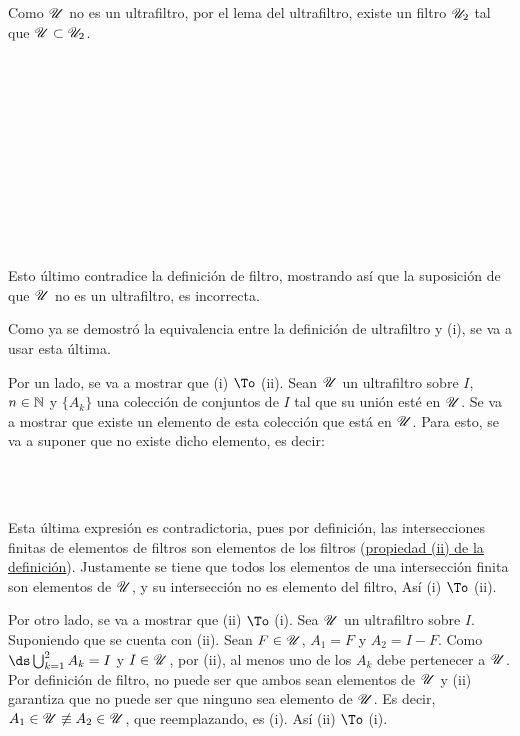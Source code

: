 \begin{demo}[i]
  Como $\mathscr{U}$ no es un ultrafiltro, por el lema del ultrafiltro, existe
  un filtro $\mathscr{U}_2$ tal que $\mathscr{U} \subset \mathscr{U}_2$.
  \begin{longderivation}
      \\
    \equiv\\
      \\
    \\
      \\
    \\
      \\
    \equiv\\
      \\
    \\
  \end{longderivation}
  Esto último contradice la definición de filtro, mostrando así que la
  suposición de que $\mathscr{U}$ no es un ultrafiltro, es incorrecta.
\end{demo}
\begin{demo}[ii]
  Como ya se demostró la equivalencia entre la definición de
  ultrafiltro y (i), se va a usar esta última.

  Por un lado, se va a mostrar que (i) $\To$ (ii).
  Sean $\mathscr{U}$ un ultrafiltro sobre $I$, $n\in\mathbb{N}$ y $\{A_k\}$ una colección
  de conjuntos de $I$ tal que su unión esté en $\mathscr{U}$. Se va a mostrar
  que existe un elemento de esta colección que está en $\mathscr{U}$. Para
  esto, se va a suponer que no existe dicho elemento, es decir:
  \begin{longderivation}
      \\
    \\
  \end{longderivation}
  Esta última expresión es contradictoria, pues por definición, las
  intersecciones finitas de elementos de filtros son elementos de los
  filtros (\hyperref[def:filtro]{propiedad (ii) de la definición}).
  Justamente se tiene que todos los elementos de una intersección finita
  son elementos de $\mathscr{U}$, y su intersección no es elemento del filtro, Así
  (i) $\To$ (ii).

  Por otro lado, se va a mostrar que (ii) $\To$ (i). Sea $\mathscr{U}$ un
  ultrafiltro sobre $I$. Suponiendo que se cuenta con (ii). Sean
  $F \in \mathscr{U}$, $A_1 = F$ y $A_2 = I-F$. Como $\ds\bigcup_{k=1}^2 A_k = I$
  y $I\in\mathscr{U}$, por (ii), al menos uno de los $A_k$ debe pertenecer a $\mathscr{U}$.
  Por definición de filtro, no puede ser que ambos sean elementos de $\mathscr{U}$
  y (ii) garantiza que no puede ser que ninguno sea elemento de $\mathscr{U}$. Es decir,
  $A_1\in\mathscr{U} \not\equiv A_2\in\mathscr{U}$, que reemplazando, es (i). Así
  (ii) $\To$ (i).
\end{demo}

